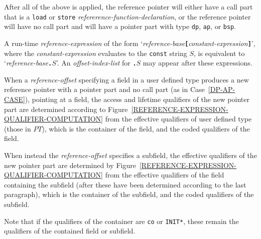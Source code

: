 \documentclass[12pt]{article}
\newcommand{\TT}[1]{{\tt \bfseries #1}}
\begin{document}
After all of the above is applied, the reference pointer will either
have a call part that is a {\tt load} or {\tt store}
{\em refererence-function-declaration}, or the reference pointer will
have no call part and will have a pointer part with type
{\tt dp}, {\tt ap}, or {\tt bsp}.

A run-time {\em reference-expression} of the form
`{\em reference-base}\TT{[}{\em constant-expression}\TT{]}',
where the {\em constant-expression} evaluates to the {\tt const}
string $S$, is equivalent to `{\em reference-base}\TT{.}$S$'.
An {\em offset-index-list} for \TT{.}$S$ may appear after these expressions.

When a {\em reference-offset} specifying a field 
in a user defined type produces a new reference pointer with a
pointer part and no call part
(as in Case~\ref{DP-AP-CASE}),
pointing at a field,
the access and lifetime qualifiers of the new
pointer part are determined according to
Figure~\ref{REFERENCE-EXPRESSION-QUALIFIER-COMPUTATION}%
\label{QUALIFIER-COMPUTATION}
from the effective qualifiers of user defined type (those in $PT$),
which is the container of the field,
and the coded qualifiers of the field.

When instead the {\em reference-offset} specifies a subfield,
the effective qualifiers of the new pointer part are determined
by Figure~\ref{REFERENCE-EXPRESSION-QUALIFIER-COMPUTATION}
from the effective qualifiers of the field containing the subfield
(after these have been determined according to the last paragraph),
which is the container of the subfield, and the coded qualifiers of
the subfield.

Note that if the qualifiers of the container
are {\tt co} or {\tt *INIT*}, these remain the qualifiers of the
contained field or subfield.
\end{document}
